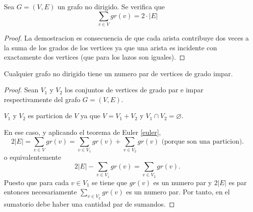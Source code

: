 \begin{theorem}[de Euler]
	\label{euler}
	Sea \(G = (V,E )\) un grafo no dirigido. Se verifica que
	\[
		\sum_{v \in  V } gr(v) = 2 \cdot |E|
	\]
\end{theorem}
\begin{proof}
	La demostracion es consecuencia de que cada arista contribuye dos veces a la suma de los grados de los vertices ya que una arista es incidente con exactamente dos vertices (que para los lazos son iguales).
\end{proof}

\begin{corollary}
	Cualquier grafo no dirigido tiene un numero par de vertices de grado impar.
\end{corollary}
\begin{proof}
	Sean \(V_1 \) y \(V_2 \) los conjuntos de vertices de grado par e impar respectivamente del grafo \(G = (V,E )\).

	\(V_1 \) y \(V_2 \) es particion de \(V \) ya que \(V = V_1 + V_2\) y \(V_1 \cap V_2 = \varnothing\).

	En ese caso, y aplicando el teorema de Euler \eqref{euler},
	\[
		2 |E| = \sum_{v \in V } gr (v) = \sum_{v \in V_1 } gr(v) + \sum_{v \in V_2 } gr(v) \text{ (porque son una particion).}
	\]
	o equivalentemente
	\[
		2 |E| - \sum_{v \in V_1 } gr(v) = \sum_{v \in V_2} gr(v).
	\]
	Puesto que para cada \(v \in V_1 \) se tiene que \(gr(v )\) es un numero par y \(2|E| \) es par entonces necesariamente \(\sum\nolimits_{v \in V_2 }	gr(v) \) es un numero par. Por tanto, en el sumatorio debe haber una cantidad par de sumandos.
\end{proof}

